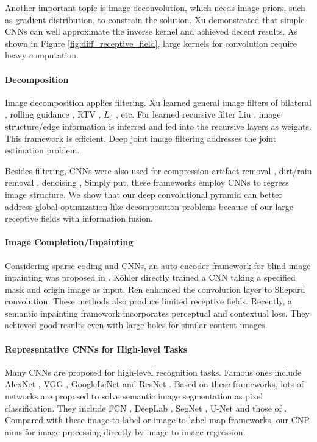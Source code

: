 \documentclass[10pt,twocolumn,letterpaper]{article}
\begin{document}
Another important topic is image deconvolution, which needs image priors, such as
gradient distribution, to constrain the solution. Xu \etal \cite{XuRLJ14} demonstrated
that simple CNNs can well approximate the inverse kernel and achieved decent results. As
shown in Figure \ref{fig:diff_receptive_field}, large kernels for convolution require
heavy computation.

\vspace{-0.15in}\paragraph{Decomposition} Image decomposition applies filtering. Xu \etal
learned general image filters of bilateral \cite{TomasiM98}, rolling guidance
\cite{ZhangSXJ14}, RTV \cite{XuYXJ12}, $L_0$ \cite{XuLXJ11}, etc. For learned recursive
filter Liu \etal \cite{LiuP016}, image structure/edge information is inferred and fed
into the recursive layers as weights. This framework is efficient. Deep joint image
filtering \cite{LiHA016} addresses the joint estimation problem.

Besides filtering, CNNs were also used for compression artifact removal \cite{DongDLT15},
dirt/rain removal \cite{EigenKF13}, denoising \cite{XieXC12,MaoSY16a}, \etc Simply put,
these frameworks employ CNNs to regress image structure. We show that our deep
convolutional pyramid can better address global-optimization-like decomposition problems
because of our large receptive fields with information fusion.

\vspace{-0.15in}\paragraph{Image Completion/Inpainting} Considering sparse coding and
CNNs, an auto-encoder framework for blind image inpainting was proposed in
\cite{XieXC12}. K\"{o}hler \etal \cite{KohlerSSH14} directly trained a CNN taking a
specified mask and origin image as input. Ren \etal \cite{RenXYS15} enhanced the
convolution layer to Shepard convolution. These methods also produce limited receptive
fields. Recently, a semantic inpainting framework \cite{YehCLHD16} incorporates
perceptual and contextual loss. They achieved good results even with large holes for
similar-content images.

\vspace{-0.15in}\paragraph{Representative CNNs for High-level Tasks} Many CNNs are
proposed for high-level recognition tasks. Famous ones include AlexNet
\cite{KrizhevskySH12}, VGG \cite{SimonyanZ14a}, GoogleLeNet \cite{SzegedyLJSRAEVR15} and
ResNet \cite{HeZRS16}. Based on these frameworks, lots of networks are proposed to solve
semantic image segmentation as pixel classification. They include FCN \cite{LongSD15},
DeepLab \cite{ChenPK0Y16}, SegNet \cite{BadrinarayananH15}, U-Net \cite{RonnebergerFB15}
and those of \cite{YuK15,LinMS016,GhiasiF16,PohlenHML16}. Compared with these
image-to-label or image-to-label-map frameworks, our CNP aims for image processing
directly by image-to-image regression.
\end{document}

